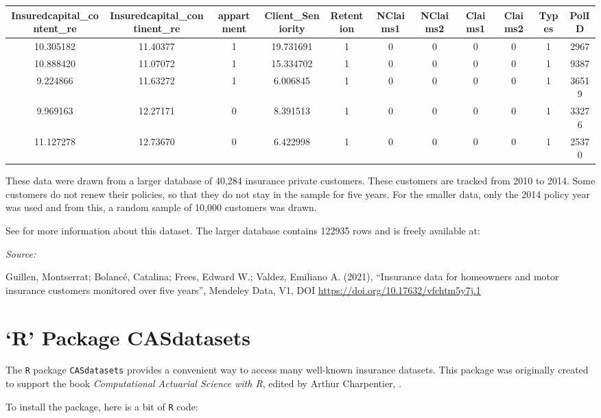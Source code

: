 \documentclass[
]{book}
\begin{document}
\begin{tabular}{c|c|c|c|c|c|c|c|c|c|c}
\hline
Insuredcapital\_content\_re & Insuredcapital\_continent\_re & appartment & Client\_Seniority & Retention & NClaims1 & NClaims2 & Claims1 & Claims2 & Types & PolID\\
\hline
10.305182 & 11.40377 & 1 & 19.731691 & 1 & 0 & 0 & 0 & 0 & 1 & 2967\\
\hline
10.888420 & 11.07072 & 1 & 15.334702 & 1 & 0 & 0 & 0 & 0 & 1 & 9387\\
\hline
9.224866 & 11.63272 & 1 & 6.006845 & 1 & 0 & 0 & 0 & 0 & 1 & 36519\\
\hline
9.969163 & 12.27171 & 0 & 8.391513 & 1 & 0 & 0 & 0 & 0 & 1 & 33276\\
\hline
11.127278 & 12.73670 & 0 & 6.422998 & 1 & 0 & 0 & 0 & 0 & 1 & 25370\\
\hline
\end{tabular}

These data were drawn from a larger database of 40,284 insurance private customers. These customers are tracked from 2010 to 2014. Some customers do not renew their policies, so that they do not stay in the sample for five years. For the smaller data, only the 2014 policy year was used and from this, a random sample of 10,000 customers was drawn.

See \citet{frees2021dependence} for more information about this dataset. The larger database contains 122935 rows and is freely available at:

\emph{Source:}

Guillen, Montserrat; Bolancé, Catalina; Frees, Edward W.; Valdez, Emiliano A. (2021), ``Insurance data for homeowners and motor insurance customers monitored over five years'', Mendeley Data, V1, DOI \url{https://doi.org/10.17632/vfchtm5y7j.1}

\hypertarget{r-package-casdatasets}{%
\section{`R' Package CASdatasets}\label{r-package-casdatasets}}

The \texttt{R} package \texttt{CASdatasets} provides a convenient way to access many well-known insurance datasets. This package was originally created to support the book \emph{Computational Actuarial Science with R}, edited by Arthur Charpentier, \citet{charpentier2014computational}.

To install the package, here is a bit of \texttt{R} code:
\end{document}
